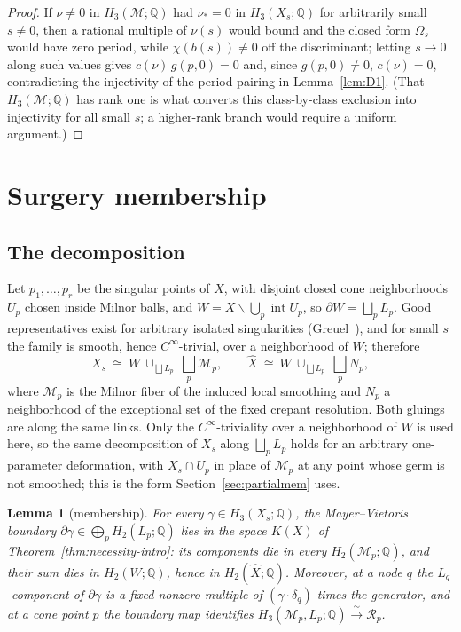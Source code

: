 \documentclass[11pt]{amsart}
\newtheorem{lemma}[theorem]{Lemma}
\theoremstyle{definition}
\theoremstyle{remark}
\theoremstyle{plain}
\newcommand{\QQ}{\mathbb{Q}}
\newcommand{\Rsm}{\mathcal{R}}   %
\newcommand{\Mil}{\mathcal{M}}  %
\newcommand{\Xh}{\widehat{X}}
\begin{document}
\begin{proof}
If $\nu\neq0$ in $H_3(\Mil;\QQ)$ had $\nu_*=0$ in $H_3(X_s;\QQ)$ for
arbitrarily small $s\neq0$, then a rational multiple of $\nu(s)$
would bound and the closed form $\Omega_s$ would have zero period,
while $\chi(b(s))\neq0$ off the discriminant; letting $s\to0$ along such
values gives $c(\nu)\,g(p,0)=0$ and, since $g(p,0)\neq0$,
$c(\nu)=0$, contradicting the injectivity of the period pairing in
Lemma~\ref{lem:D1}.  (That $H_3(\Mil;\QQ)$ has rank one is what converts
this class-by-class exclusion into injectivity for all small $s$; a
higher-rank branch would require a uniform argument.)
\end{proof}

\section{Surgery membership}\label{sec:surgery}

\subsection{The decomposition}\label{sec:decomp}
Let $p_1,\dots,p_r$ be the singular points of $X$, with disjoint
closed cone neighborhoods $U_p$ chosen inside Milnor balls, and
$W=X\smallsetminus\bigcup_p\operatorname{int}U_p$, so
$\partial W=\bigsqcup_pL_p$.  Good representatives exist for
arbitrary isolated singularities
(Greuel~\cite[Definition~2.12, Lemma~2.13, Theorem~2.15]{Greuel19}),
and for small $s$ the family is smooth, hence $C^\infty$-trivial, over
a neighborhood of $W$; therefore
\[
X_s\ \cong\ W\ \cup_{\bigsqcup L_p}\ \bigsqcup_p\Mil_p,
\qquad
\Xh\ \cong\ W\ \cup_{\bigsqcup L_p}\ \bigsqcup_pN_p,
\]
where $\Mil_p$ is the Milnor fiber of the induced local smoothing and
$N_p$ a neighborhood of the exceptional set of the fixed crepant
resolution.  Both gluings are along the same links.  Only the
$C^\infty$-triviality over a neighborhood of $W$ is used here, so the
same decomposition of $X_s$ along $\bigsqcup_pL_p$ holds for an
arbitrary one-parameter deformation, with $X_s\cap U_p$ in place of
$\Mil_p$ at any point whose germ is not smoothed; this is the form
Section~\ref{sec:partialmem} uses.

\begin{lemma}[membership]\label{lem:M}
For every $\gamma\in H_3(X_s;\QQ)$, the Mayer--Vietoris boundary
$\partial\gamma\in\bigoplus_pH_2(L_p;\QQ)$ lies in the space $K(X)$
of Theorem~\ref{thm:necessity-intro}: its components die in every
$H_2(\Mil_p;\QQ)$, and their sum dies in $H_2(W;\QQ)$, hence in
$H_2(\Xh;\QQ)$.  Moreover, at a node $q$ the $L_q$-component of
$\partial\gamma$ is a fixed nonzero multiple of
$(\gamma\cdot\delta_q)$ times the generator, and at a cone point $p$
the boundary map identifies
$H_3(\Mil_p,L_p;\QQ)\xrightarrow{\ \sim\ }\Rsm_p$.
\end{lemma}
\end{document}
